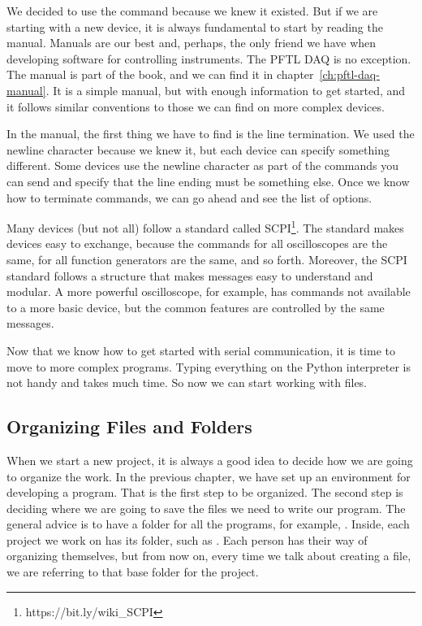We decided to use the  command because we knew it existed. But if we are starting with a new device, it is always fundamental to start by reading the manual. Manuals are our best and, perhaps, the only friend we have when developing software for controlling instruments. The {PFTL DAQ} is no exception. The manual is part of the book, and we can find it in chapter~\ref{ch:pftl-daq-manual}. It is a simple manual, but with enough information to get started, and it follows similar conventions to those we can find on more complex devices.

In the manual, the first thing we have to find is the line termination. We used the newline character because we knew it, but each device can specify something different. Some devices use the newline character as part of the commands you can send and specify that the line ending must be something else. Once we know how to terminate commands, we can go ahead and see the list of options.

Many devices (but not all) follow a standard called SCPI\footnote{https://bit.ly/wiki\_SCPI}. The standard makes devices easy to exchange, because the commands for all oscilloscopes are the same, for all function generators are the same, and so forth. Moreover, the SCPI standard follows a structure that makes messages easy to understand and modular. A more powerful oscilloscope, for example, has commands not available to a more basic device, but the common features are controlled by the same messages.

Now that we know how to get started with serial communication, it is time to move to more complex programs. Typing everything on the Python interpreter is not handy and takes much time. So now we can start working with files.

\subsection{Organizing Files and Folders}\label{subsec:organizing-files-and-folders}
When we start a new project, it is always a good idea to decide how we are going to organize the work. In the previous chapter, we have set up an environment for developing a program. That is the first step to be organized. The second step is deciding where we are going to save the files we need to write our program. The general advice is to have a folder for all the programs, for example, . Inside, each project we work on has its folder, such as . Each person has their way of organizing themselves, but from now on, every time we talk about creating a file, we are referring to that base folder for the project.


